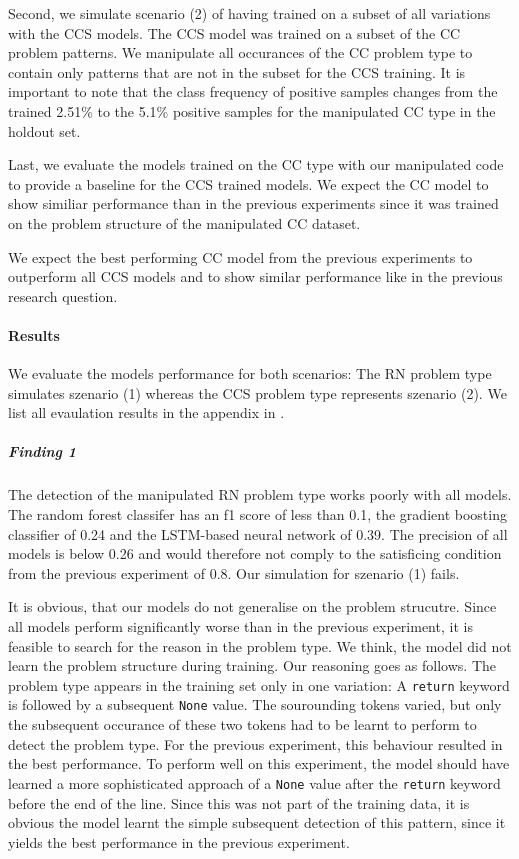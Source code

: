 Second, we simulate scenario (2) of having trained on a subset of all variations with the CCS models. The CCS model was trained on a subset of the CC problem patterns. We manipulate all occurances of the CC problem type to contain only patterns that are not in the subset for the CCS training. It is important to note that the class frequency of positive samples changes from the trained 2.51\% to the 5.1\% positive samples for the manipulated CC type in the holdout set.

Last, we evaluate the models trained on the CC type with our manipulated code to provide a baseline for the CCS trained models. We expect the CC model to show similiar performance than in the previous experiments since it was trained on the problem structure of the manipulated CC dataset.

We expect the best performing CC model from the previous experiments to outperform all CCS models and to show similar performance like in the previous research question. 

\paragraph{Results}
We evaluate the models performance for both scenarios: The RN problem type simulates szenario (1) whereas the CCS problem type represents szenario (2). We list all evaulation results in the appendix in .

\subparagraph{Finding 1}\label{finding:return_none_manipulated_bad}
The detection of the manipulated RN problem type works poorly with all models. The random forest classifer has an f1 score of less than 0.1, the gradient boosting classifier of 0.24 and the LSTM-based neural network of 0.39. The precision of all models is below 0.26 and would therefore not comply to the satisficing condition from the previous experiment of 0.8. Our simulation for szenario (1) fails.

It is obvious, that our models do not generalise on the problem strucutre.  Since all models perform significantly worse than in the previous experiment, it is feasible to search for the reason in the problem type.  We think, the model did not learn the problem structure during training. Our reasoning goes as follows.
The problem type appears in the training set only in one variation: A \texttt{return} keyword is followed by a subsequent \texttt{None} value. The sourounding tokens varied, but only the subsequent occurance of these two tokens had to be learnt to perform to detect the problem type. For the previous experiment, this behaviour resulted in the best performance. To perform well on this experiment, the model should have learned a more sophisticated approach of a \texttt{None} value after the \texttt{return} keyword before the end of the line. Since this was not part of the training data, it is obvious the model learnt the simple subsequent detection of this pattern, since it yields the best performance in the previous experiment.

